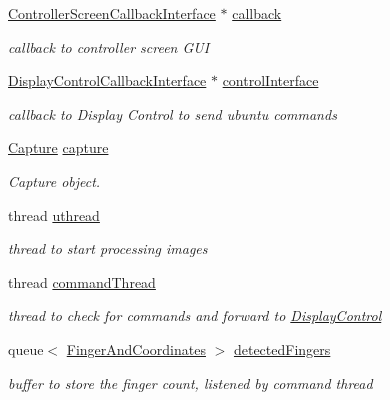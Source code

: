 \begin{DoxyCompactItemize}
\hyperlink{class_controller_screen_callback_interface}{Controller\+Screen\+Callback\+Interface} $\ast$ \hyperlink{class_gestro_1_1_capture_and_detect_ab137d75874d927cb28c5c46e29b82e86}{callback}
\begin{DoxyCompactList}\small\item\em callback to controller screen G\+UI \end{DoxyCompactList}\item 
\hyperlink{class_gestro_1_1_display_control_callback_interface}{Display\+Control\+Callback\+Interface} $\ast$ \hyperlink{class_gestro_1_1_capture_and_detect_ab21df2b869f25d82734079877139d7e4}{control\+Interface}
\begin{DoxyCompactList}\small\item\em callback to Display Control to send ubuntu commands \end{DoxyCompactList}\item 
\hyperlink{class_gesture_detection_1_1_capture}{Capture} \hyperlink{class_gestro_1_1_capture_and_detect_a6873c3bb2ab557d3997b39f0de032233}{capture}
\begin{DoxyCompactList}\small\item\em Capture object. \end{DoxyCompactList}\item 
thread \hyperlink{class_gestro_1_1_capture_and_detect_a0c143ab4c3181d7f32da71bb161e8d02}{uthread}
\begin{DoxyCompactList}\small\item\em thread to start processing images \end{DoxyCompactList}\item 
thread \hyperlink{class_gestro_1_1_capture_and_detect_a0c079f5a40fa2b8485331d0392b40c37}{command\+Thread}
\begin{DoxyCompactList}\small\item\em thread to check for commands and forward to \hyperlink{class_gestro_1_1_display_control}{Display\+Control} \end{DoxyCompactList}\item 
queue$<$ \hyperlink{class_gesture_detection_1_1_finger_and_coordinates}{Finger\+And\+Coordinates} $>$ \hyperlink{class_gestro_1_1_capture_and_detect_a7f7e00691a7d60b5de4c481f8c071bf4}{detected\+Fingers}
\begin{DoxyCompactList}\small\item\em buffer to store the finger count, listened by command thread \end{DoxyCompactList}\item 

\end{DoxyCompactItemize}

